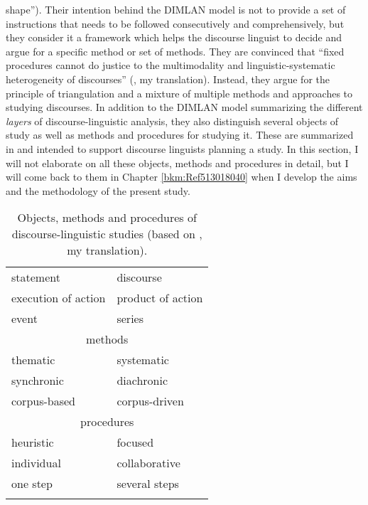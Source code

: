 shape”). Their intention behind the DIMLAN model is not to provide a set of instructions that needs to be followed consecutively and comprehensively, but they consider it a framework which helps the discourse linguist to decide and argue for a specific method or set of methods. They are convinced that “fixed procedures cannot do justice to the multimodality and linguistic-systematic heterogeneity of discourses” (\citealt[135]{Spitzmuller2011}, my translation). Instead, they argue for the principle of triangulation and a mixture of multiple methods and approaches to studying discourses. In addition to the DIMLAN model summarizing the different \emph{layers} of discourse-linguistic analysis, they also distinguish several objects of study as well as methods and procedures for studying it. These are summarized in  and intended to support discourse linguists planning a study. In this section, I will not elaborate on all these objects, methods and procedures in detail, but I will come back to them in Chapter \ref{bkm:Ref513018040} when I develop the aims and the methodology of the present study.


\begin{table}
\begin{tabularx}{.55\textwidth}{XX}
\lsptoprule
\multicolumn{2}{c}{ objects}\\
\midrule
statement & discourse\\
execution of action & product of action\\
event & series\\
\midrule
\multicolumn{2}{c}{ methods}\\
\midrule
thematic & systematic\\
synchronic & diachronic\\
corpus-based & corpus-driven\\
\midrule
\multicolumn{2}{c}{ procedures}\\
\midrule
heuristic & focused\\
individual & collaborative\\
one step & several steps\\
\lspbottomrule
\end{tabularx}
\caption{
Objects, methods and procedures of discourse-linguistic studies (based on \citealt[124--135]{Spitzmuller2011}, my translation).
}
\label{tab:2:7}\label{tab:key:7}
\end{table}


